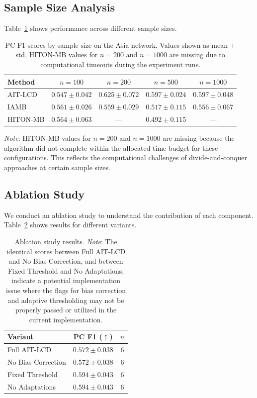 \documentclass{article}
\theoremstyle{plain}
\theoremstyle{definition}
\begin{document}
\subsection{Sample Size Analysis}

Table~\ref{tab:sample_size} shows performance across different sample sizes.

\begin{table}[t]
\caption{PC F1 scores by sample size on the Asia network. Values shown as mean $\pm$ std. HITON-MB values for $n=200$ and $n=1000$ are missing due to computational timeouts during the experiment runs.}
\label{tab:sample_size}
\centering
\begin{tabular}{lcccc}
\toprule
Method & $n=100$ & $n=200$ & $n=500$ & $n=1000$ \\
\midrule
AIT-LCD & $0.547 \pm 0.042$ & $0.625 \pm 0.072$ & $0.597 \pm 0.024$ & $0.597 \pm 0.048$ \\
IAMB & $0.561 \pm 0.026$ & $0.559 \pm 0.029$ & $0.517 \pm 0.115$ & $0.556 \pm 0.067$ \\
HITON-MB & $0.564 \pm 0.063$ & --- & $0.492 \pm 0.115$ & --- \\
\bottomrule
\end{tabular}
\end{table}

\textit{Note}: HITON-MB values for $n=200$ and $n=1000$ are missing because the algorithm did not complete within the allocated time budget for these configurations. This reflects the computational challenges of divide-and-conquer approaches at certain sample sizes.

\subsection{Ablation Study}

We conduct an ablation study to understand the contribution of each component. Table~\ref{tab:ablation} shows results for different variants.

\begin{table}[t]
\caption{Ablation study results. \textit{Note}: The identical scores between Full AIT-LCD and No Bias Correction, and between Fixed Threshold and No Adaptations, indicate a potential implementation issue where the flags for bias correction and adaptive thresholding may not be properly passed or utilized in the current implementation.}
\label{tab:ablation}
\centering
\begin{tabular}{lcc}
\toprule
Variant & PC F1 ($\uparrow$) & $n$ \\
\midrule
Full AIT-LCD & $0.572 \pm 0.038$ & 6 \\
No Bias Correction & $0.572 \pm 0.038$ & 6 \\
Fixed Threshold & $0.594 \pm 0.043$ & 6 \\
No Adaptations & $0.594 \pm 0.043$ & 6 \\
\bottomrule
\end{tabular}
\end{table}
\end{document}
